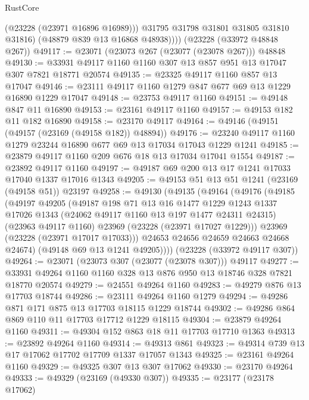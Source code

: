 \begin{lexlean}{RustCore}
\begin{coremodule}
              (@23228 (@23971 @16896 @16989)))
            @31795
            @31798
            @31801
            @31805
            @31810
            @31816)
          (@48879 @839 @13 @16868 @48938))))
    (@23228 (@33972 @48848 @267))
@49117 := @23071 (@23073 @267 (@23077 (@23078 @267))) @48848
@49130 := @33931 @49117 @1160 @1160 @307 @13 @857 @951 @13 @17047 @307 @7821 @18771 @20574
@49135 := @23325 @49117 @1160 @857 @13 @17047
@49146 := @23111 @49117 @1160 @1279 @847 @677 @69 @13 @1229 @16890 @1229 @17047
@49148 := @23753 @49117 @1160
@49151 := @49148 @847 @11 @16890
@49153 := @23161 @49117 @1160
@49157 := @49153 @182 @11 @182 @16890
@49158 := @23170 @49117
@49164 := @49146 (@49151 (@49157 (@23169 (@49158 @182)) @48894))
@49176 := @23240 @49117 @1160 @1279 @23244 @16890 @677 @69 @13 @17034 @17043 @1229 @1241
@49185 := @23879 @49117 @1160 @209 @676 @18 @13 @17034 @17041 @1554
@49187 := @23892 @49117 @1160
@49197 := @49187 @69 @200 @13 @17 @1241 @17033 @17040 @1337 @17016 @1343
@49205 := @49153 @51 @13 @51 @1241 (@23169 (@49158 @51)) @23197
@49258 := @49130
    (@49135
      (@49164
        (@49176
          (@49185
            (@49197
              @49205
              (@49187
                @198
                @71
                @13
                @16
                @1477
                @1229
                @1243
                @1337
                @17026
                @1343
                (@24062 @49117 @1160 @13 @197 @1477 @24311 @24315)
                (@23963 @49117 @1160)
                @23969
                (@23228 (@23971 @17027 @1229)))
              @23969
              (@23228 (@23971 @17017 @17033)))
            @24653
            @24656
            @24659
            @24663
            @24668
            @24674)
          (@49148 @69 @13 @1241 @49205))))
    (@23228 (@33972 @49117 @307))
@49264 := @23071 (@23073 @307 (@23077 (@23078 @307))) @49117
@49277 := @33931 @49264 @1160 @1160 @328 @13 @876 @950 @13 @18746 @328 @7821 @18770 @20574
@49279 := @24551 @49264 @1160
@49283 := @49279 @876 @13 @17703 @18744
@49286 := @23111 @49264 @1160 @1279
@49294 := @49286 @871 @171 @875 @13 @17703 @18115 @1229 @18744
@49302 := @49286 @864 @869 @110 @11 @17703 @17712 @1229 @18115
@49304 := @23879 @49264 @1160
@49311 := @49304 @152 @863 @18 @11 @17703 @17710 @1363
@49313 := @23892 @49264 @1160
@49314 := @49313 @861
@49323 := @49314 @739 @13 @17 @17062 @17702 @17709 @1337 @17057 @1343
@49325 := @23161 @49264 @1160
@49329 := @49325 @307 @13 @307 @17062
@49330 := @23170 @49264
@49333 := @49329 (@23169 (@49330 @307))
@49335 := @23177 (@23178 @17062)

\end{coremodule}
\end{lexlean}
